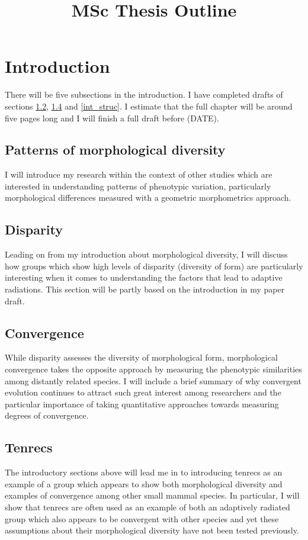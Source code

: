 \documentclass[12pt,a4paper]{article}
\begin{document}
\title{MSc Thesis Outline}
\author{}
\date{}
\maketitle



\section{Introduction}
	There will be five subsections in the introduction. I have completed drafts of sections \ref{int_disp}, \ref{int_tenrecs} and \ref*{int_struc}. I estimate that the full chapter will be around five pages long and I will finish a full draft before (DATE).

	\subsection{Patterns of morphological diversity}
		I will introduce my research within the context of other studies which are interested in understanding patterns of phenotypic variation, particularly morphological differences measured with a geometric morphometrics approach. 

	\subsection{Disparity}
		\label{int_disp}
		Leading on from my introduction about morphological diversity, I will discuss how groups which show high levels of disparity (diversity of form) are particularly interesting when it comes to understanding the factors that lead to adaptive radiations. This section will be partly based on the introduction in my paper draft.  
		
	\subsection{Convergence}
		While disparity assesses the diversity of morphological form, morphological convergence takes the opposite approach by measuring the phenotypic similarities among distantly related species. I will include a brief summary of why convergent evolution continues to attract such great interest among researchers and the particular importance of taking quantitative approaches towards measuring degrees of convergence.
	
	\subsection{Tenrecs}
		\label{int_tenrecs}
		The introductory sections above will lead me in to introducing tenrecs as an example of a group which appears to show both morphological diversity and examples of convergence among other small mammal species. In particular, I will show that tenrecs are often used as an example of both an adaptively radiated group which also appears to be convergent with other species and yet these assumptions about their morphological diversity have not been tested previously. 
			 
\end{document}
